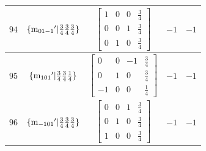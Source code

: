 \documentclass[fleqn,8pt]{jsarticle}
\begin{document}
\begin{longtable}{ccccc}
$ 94 $ & $ \{{\rm m}_{01-1}{}'|\frac{3}{4} \frac{3}{4} \frac{3}{4}\} $ & $ \begin{bmatrix} 1 & 0 & 0 & \frac{3}{4} \\ 0 & 0 & 1 & \frac{3}{4} \\ 0 & 1 & 0 & \frac{3}{4} \end{bmatrix} $ & $ -1 $ & $ -1 $ \\ \hline
$ 95 $ & $ \{{\rm m}_{101}{}'|\frac{3}{4} \frac{3}{4} \frac{1}{4}\} $ & $ \begin{bmatrix} 0 & 0 & -1 & \frac{3}{4} \\ 0 & 1 & 0 & \frac{3}{4} \\ -1 & 0 & 0 & \frac{1}{4} \end{bmatrix} $ & $ -1 $ & $ -1 $ \\ \hline
$ 96 $ & $ \{{\rm m}_{-101}{}'|\frac{3}{4} \frac{3}{4} \frac{3}{4}\} $ & $ \begin{bmatrix} 0 & 0 & 1 & \frac{3}{4} \\ 0 & 1 & 0 & \frac{3}{4} \\ 1 & 0 & 0 & \frac{3}{4} \end{bmatrix} $ & $ -1 $ & $ -1 $ \\
\end{longtable}
\end{document}

